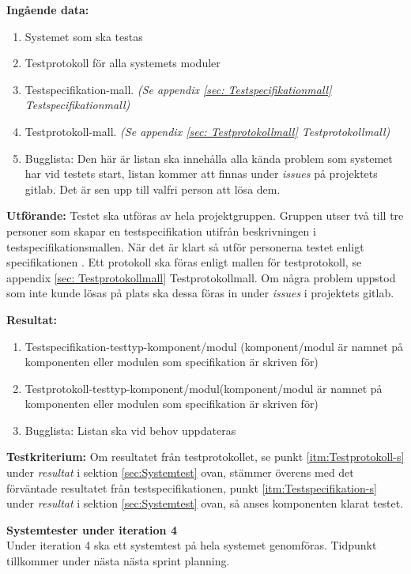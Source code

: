 \documentclass[a4paper,10pt, twoside]{article}
\begin{document}
\textbf{Ingående data:}
\begin{enumerate}
	\item Systemet som ska testas
    \item Testprotokoll för alla systemets moduler
    \item Testspecifikation-mall. \emph{(Se appendix \ref{sec: Testspecifikationmall} Testspecifikationmall)}
    \item Testprotokoll-mall. \emph{(Se appendix \ref{sec: Testprotokollmall} Testprotokollmall)}
    \item Bugglista: Den här är listan ska innehålla alla kända problem som systemet har vid testets start, listan kommer att finnas under \emph{issues} på 	 projektets gitlab. Det är sen upp till valfri person att lösa dem.
\end{enumerate}

\textbf{Utförande:} Testet ska utföras av hela projektgruppen. Gruppen utser två till tre personer som skapar en testspecifikation utifrån beskrivningen i
testspecifikationsmallen. När det är klart så utför personerna testet enligt specifikationen \cite{kravspec}. Ett protokoll ska föras enligt mallen för
testprotokoll, se appendix \ref{sec: Testprotokollmall} Testprotokollmall. Om några problem uppstod som inte kunde lösas på plats ska dessa föras in under \emph{issues} i projektets gitlab.

\textbf{Resultat:}
    \begin{enumerate}
        \item \label{itm:Testspecifikation-s}
         Testspecifikation-testtyp-komponent/modul (komponent/modul är namnet på komponenten eller 				 modulen som specifikation är skriven för)
        \item \label{itm:Testprotokoll-s} Testprotokoll-testtyp-komponent/modul(komponent/modul är 				 namnet på komponenten eller modulen som specifikation är skriven för)
        \item Bugglista: Listan ska vid behov uppdateras
    \end{enumerate}

\textbf{Testkriterium:} Om resultatet från testprotokollet, se punkt
\ref{itm:Testprotokoll-s} under \emph{resultat} i sektion \ref{sec:Systemtest} ovan, stämmer överens med det förväntade resultatet från testspecifikationen, punkt \ref{itm:Testspecifikation-s} under \emph{resultat} i sektion
\ref{sec:Systemtest} ovan, så anses komponenten klarat testet.

\textbf{Systemtester under iteration 4}
\\ Under iteration 4 ska ett systemtest på hela systemet genomföras. Tidpunkt tillkommer under nästa
   nästa sprint planning.
\end{document}
